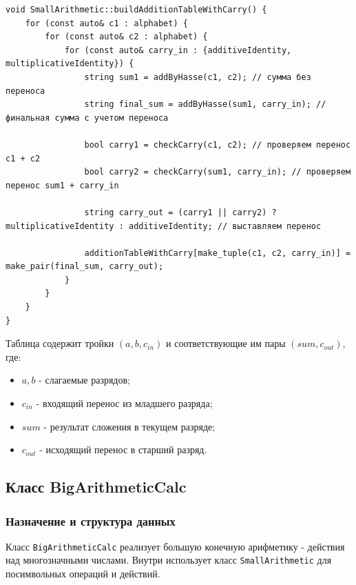 \begin{lstlisting}[style=cstyle, caption={Реализация buildAdditionTableWithCarry()}]
void SmallArithmetic::buildAdditionTableWithCarry() {
    for (const auto& c1 : alphabet) {
        for (const auto& c2 : alphabet) {
            for (const auto& carry_in : {additiveIdentity, multiplicativeIdentity}) {
                string sum1 = addByHasse(c1, c2); // сумма без переноса
                string final_sum = addByHasse(sum1, carry_in); // финальная сумма с учетом переноса

                bool carry1 = checkCarry(c1, c2); // проверяем перенос с1 + с2
                bool carry2 = checkCarry(sum1, carry_in); // проверяем перенос sum1 + carry_in

                string carry_out = (carry1 || carry2) ? multiplicativeIdentity : additiveIdentity; // выставляем перенос

                additionTableWithCarry[make_tuple(c1, c2, carry_in)] = make_pair(final_sum, carry_out);
            }
        }
    }
}
\end{lstlisting}

Таблица содержит тройки $(a, b, c_{in})$ и соответствующие им пары $(sum, c_{out})$, где: 
\begin{itemize}
    \item $a, b$ - слагаемые разрядов;
    \item $c_{in}$ - входящий перенос из младшего разряда;
    \item $sum$ - результат сложения в текущем разряде;
    \item $c_{out}$ - исходящий перенос в старший разряд.
\end{itemize}

\newpage

\subsection{Класс BigArithmeticCalc}

\subsubsection{Назначение и структура данных}

Класс \texttt{BigArithmeticCalc} реализует большую конечную арифметику - действия над многозначными числами. Внутри использует класс \texttt{SmallArithmetic} для посимвольных операций и действий.



